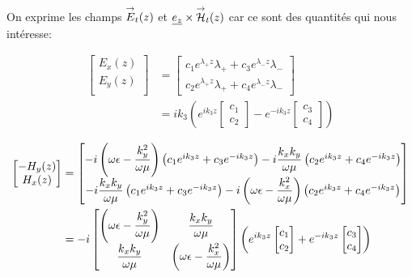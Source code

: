     On exprime les champs ${\overset{\rightarrow}{E}}_t(z)$ et $\underline{e_z} \times {\overset{\rightarrow}{\mathcal{H}}}_t(z)$ car ce sont des quantités qui nous intéresse:

    \begin{align}
        \begin{bmatrix}
            E_x(z)\\
            E_y(z)\\
        \end{bmatrix}
        &=
        \begin{bmatrix}
            c_1 e^{\lambda_+ z} \lambda_{+} + c_3 e^{\lambda_- z} \lambda_{-} \\
            c_2 e^{\lambda_+ z} \lambda_{+} + c_4 e^{\lambda_- z} \lambda_{-}
        \end{bmatrix}\\
        &=ik_3\left( e^{ik_3 z}
        \begin{bmatrix}
            c_1 \\
            c_2
        \end{bmatrix}
        -e^{-ik_3 z}
        \begin{bmatrix}
            c_3 \\
            c_4
        \end{bmatrix}
        \right)
        \label{eq:imp_fourier:plan:generale_E}
    \end{align}

    \begin{align}
        \begin{bmatrix}
            -H_y(z)\\
            H_x(z)\\
        \end{bmatrix}
        &=
        \begin{bmatrix}
            -i\left(\omega\epsilon - \dfrac{k_y^2}{\omega\mu}\right) \left( c_1 e^{ik_3 z} + c_3 e^{-ik_3 z} \right) - i\dfrac{k_xk_y}{\omega\mu} \left( c_2 e^{ik_3 z} + c_4 e^{-ik_3 z} \right)
            \\
            -i\dfrac{k_xk_y}{\omega\mu} \left( c_1 e^{ik_3 z} + c_3 e^{-ik_3 z} \right) - i\left(\omega\epsilon - \dfrac{k_x^2}{\omega\mu}\right)\left( c_2 e^{ik_3 z} + c_4 e^{-ik_3 z} \right)
        \end{bmatrix} \\
        &=-i
        \begin{bmatrix}
        \left(\omega\epsilon - \dfrac{k_y^2}{\omega\mu}\right) & \dfrac{k_xk_y}{\omega\mu}
        \\
        \dfrac{k_xk_y}{\omega\mu} & \left(\omega\epsilon - \dfrac{k_x^2}{\omega\mu}\right) 
        \end{bmatrix}
        \left(
            e^{ik_3 z}
            \begin{bmatrix}
                c_1 \\
                c_2
            \end{bmatrix}
            +e^{-ik_3 z}
            \begin{bmatrix}
                c_3 \\
                c_4
            \end{bmatrix}
        \right)
        \label{eq:imp_fourier:plan:generale_H}
    \end{align}

